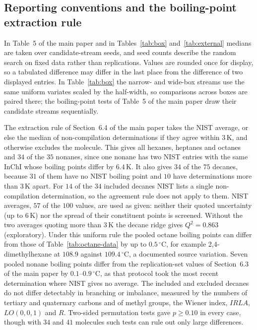 \documentclass[a5paper, 10pt]{article}
\theoremstyle{plain}
\theoremstyle{remark}
\theoremstyle{definition}
\begin{document}
\subsection*{Reporting conventions and the boiling-point extraction rule}
In Table~5 of the main paper and in Tables~\ref{tab:box} and~\ref{tab:external} medians are taken over candidate-stream seeds, and seed counts describe the random search on fixed data rather than replications. Values are rounded once for display, so a tabulated difference may differ in the last place from the difference of two displayed entries. In Table~\ref{tab:box} the narrow- and wide-box streams use the same uniform variates scaled by the half-width, so comparisons across boxes are paired there; the boiling-point tests of Table~5 of the main paper draw their candidate streams sequentially.

The extraction rule of Section~6.4 of the main paper takes the NIST
average, or else the median of non-compilation determinations if they
agree within $3$\,K, and otherwise excludes the molecule. This gives all
hexanes, heptanes and octanes and $34$ of the $35$ nonanes, since one
nonane has two NIST entries with the same InChI whose boiling points
differ by $6.4$\,K. It also gives $34$ of the $75$ decanes, because
$31$ of them have no NIST boiling point and $10$ have determinations
more than $3$\,K apart. For $14$ of the $34$ included decanes NIST lists
a single non-compilation determination, so the agreement rule does not
apply to them. NIST averages, $57$ of the $100$ values, are used as given: neither their quoted uncertainty (up to $6$\,K) nor the spread of their constituent points is screened. Without the two averages quoting more than $3$\,K the decane ridge gives $Q^2 = 0.863$ (exploratory). Under this uniform rule the pooled octane boiling points
can differ from those of Table~\ref{tab:octane-data} by up to
$0.5\,^{\circ}$C, for example 2,4-dimethylhexane at $108.9$ against
$109.4\,^{\circ}$C, a documented source variation. Seven pooled nonane boiling points differ from the replication-set values of
Section~6.3 of the main paper by $0.1$--$0.9\,^{\circ}$C, as that protocol
took the most recent determination where NIST gives no average. The
included and excluded decanes do not differ detectably in branching or
imbalance, measured by the numbers of tertiary and quaternary carbons
and of methyl groups, the Wiener index, $IRLA$, $LO(0,0,1)$ and $R$.
Two-sided permutation tests gave $p \ge 0.10$ in every case, though
with $34$ and $41$ molecules such tests can rule out only large
differences.
\end{document}
